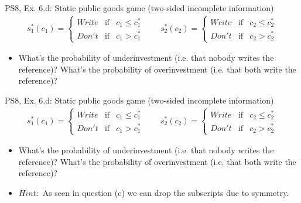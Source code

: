 \begin{frame}{PS8, Ex. 6.d: Static public goods game (two-sided incomplete information)}
    \begin{align*}
      s_1^*(c_1)=\left\{\begin{array}{rcl}
        Write & \text{if} & c_1\leq c_1^*\\
        Don't & \text{if} & c_1>c_1^*
        \end{array}\right.\quad\quad
      s_2^*(c_2)=\left\{\begin{array}{rcl}
        Write & \text{if} & c_2\leq c_2^*\\
        Don't & \text{if} & c_2>c_2^*
        \end{array}\right.
    \end{align*}
    \vspace{-12pt}
    \begin{itemize}
      \item[(d)] What’s the probability of underinvestment (i.e. that nobody writes the reference)? What’s the probability of overinvestment (i.e. that both write the reference)?
    \end{itemize}
    \vfill\null
\end{frame}
\begin{frame}{PS8, Ex. 6.d: Static public goods game (two-sided incomplete information)}
    \begin{align*}
      s_1^*(c_1)=\left\{\begin{array}{rcl}
        Write & \text{if} & c_1\leq c_1^*\\
        Don't & \text{if} & c_1>c_1^*
        \end{array}\right.\quad\quad
      s_2^*(c_2)=\left\{\begin{array}{rcl}
        Write & \text{if} & c_2\leq c_2^*\\
        Don't & \text{if} & c_2>c_2^*
        \end{array}\right.
    \end{align*}
    \vspace{-12pt}
    \begin{itemize}
      \item[(d)] What’s the probability of underinvestment (i.e. that nobody writes the reference)? What’s the probability of overinvestment (i.e. that both write the reference)?
      \item[]    $Hint:$ As seen in question (c) we can drop the subscripts due to symmetry.
    \end{itemize}
    \vfill\null
\end{frame}
